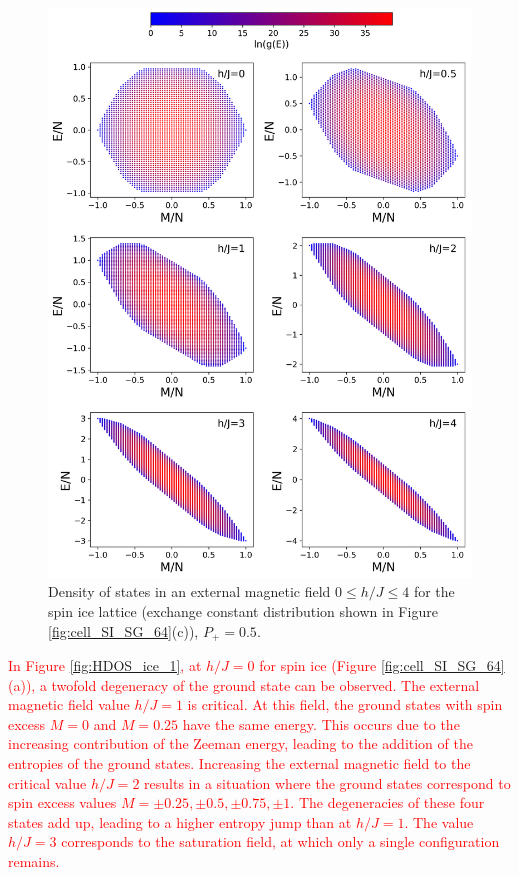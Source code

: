 \documentclass[preprint,12pt]{elsarticle}
\begin{document}
	
	\begin{figure}[H]
		\centering
		\includegraphics[width=1\linewidth]{pictures/HDOS_SI_64_J0.png}
		\caption{Density of states in an external magnetic field $0\leq h/J \leq 4$ for the spin ice lattice (exchange constant distribution shown in Figure \ref{fig:cell_SI_SG_64}(c)), $P_+ = 0.5$.}
		\label{fig:HDOS_ice}
	\end{figure}
	
	\textcolor{red}{In Figure \ref{fig:HDOS_ice_1}, at $h/J = 0$ for spin ice (Figure \ref{fig:cell_SI_SG_64}(a)), a twofold degeneracy of the ground state can be observed. The external magnetic field value $h/J = 1$ is critical. At this field, the ground states with spin excess $M = 0$ and $M = 0.25$ have the same energy. This occurs due to the increasing contribution of the Zeeman energy, leading to the addition of the entropies of the ground states.  
	Increasing the external magnetic field to the critical value $h/J = 2$ results in a situation where the ground states correspond to spin excess values $M = \pm0.25, \pm0.5, \pm0.75, \pm1$. The degeneracies of these four states add up, leading to a higher entropy jump than at $h/J = 1$.  
	The value $h/J = 3$ corresponds to the saturation field, at which only a single configuration remains.}
	
\end{document}
